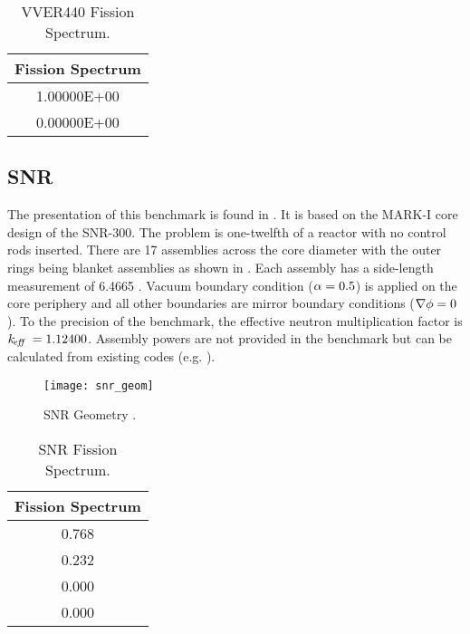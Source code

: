     \begin{table}
      \caption{VVER440 Fission Spectrum.}
      \label{tab:vver440chi}
      \begin{center}
        \begin{tabular}{c}
          \toprule
          Fission Spectrum \\
          \midrule
          1.00000E+00  \\
          0.00000E+00  \\
          \bottomrule
        \end{tabular}
      \end{center}
    \end{table}
  \subsection{SNR}
    \label{sec:snr}
    The presentation of this benchmark is found in \cite{argonneBenchmark}. It
    is based on the MARK-I core design of the SNR-300. The problem is
    one-twelfth of a reactor with no control rods inserted. There are 17
    assemblies across the core diameter with the outer rings being blanket
    assemblies as shown in . Each assembly has a side-length
    measurement of 6.4665 . Vacuum boundary condition ($\alpha =
    0.5$) is applied on the core periphery and all other boundaries are mirror
    boundary conditions ($\mathbf{\nabla} \phi = 0$). To the precision of the benchmark,
    the effective neutron multiplication factor is $k_{\!\mbox{\scriptsize \em eff}}\  = 1.12400$. Assembly
    powers are not provided in the benchmark but can be calculated from existing
    codes (e.g. \dif).
    \begin{figure}
      \centering
      \texttt{[image: snr\_geom]}
      \caption{SNR Geometry \cite{argonneBenchmark}.}
      \label{fig:snr_geom}
    \end{figure}
    \begin{table}
      \caption{SNR Fission Spectrum.}
      \label{tab:snrchi}
      \begin{center}
        \begin{tabular}{c}
          \toprule
          Fission Spectrum \\
          \midrule
          0.768 \\
          0.232 \\
          0.000 \\
          0.000 \\
          \bottomrule
        \end{tabular}
      \end{center}
    \end{table}
